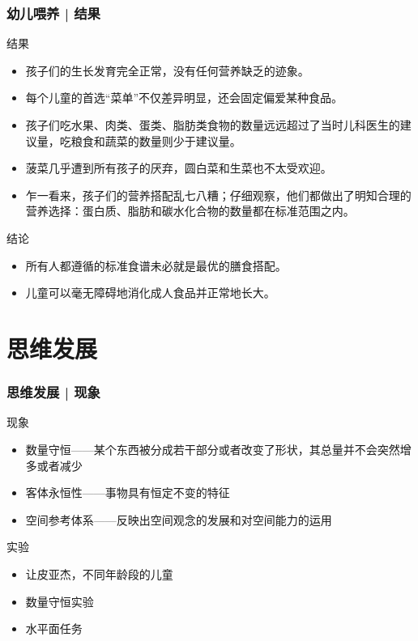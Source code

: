 \begin{frame}
  \frametitle{幼儿喂养 | 结果}
  \begin{block}{结果}
    \begin{itemize}
      \item 孩子们的生长发育完全正常，没有任何营养缺乏的迹象。
      \item 每个儿童的首选“菜单”不仅差异明显，还会固定偏爱某种食品。
      \item 孩子们吃水果、肉类、蛋类、脂肪类食物的数量远远超过了当时儿科医生的建议量，吃粮食和蔬菜的数量则少于建议量。
      \item 菠菜几乎遭到所有孩子的厌弃，圆白菜和生菜也不太受欢迎。
      \item 乍一看来，孩子们的营养搭配乱七八糟；仔细观察，他们都做出了明知合理的营养选择：蛋白质、脂肪和碳水化合物的数量都在标准范围之内。
    \end{itemize}
  \end{block}
  \pause
  \begin{block}{结论}
    \begin{itemize}
      \item 所有人都遵循的标准食谱未必就是最优的膳食搭配。
      \item 儿童可以毫无障碍地消化成人食品并正常地长大。
    \end{itemize}
  \end{block}
\end{frame}

\section{思维发展}
\begin{frame}
  \frametitle{思维发展 | 现象}
  \begin{block}{现象}
    \begin{itemize}
      \item 数量守恒——某个东西被分成若干部分或者改变了形状，其总量并不会突然增多或者减少
      \item 客体永恒性——事物具有恒定不变的特征
      \item 空间参考体系——反映出空间观念的发展和对空间能力的运用
    \end{itemize}
  \end{block}
  \pause
  \begin{block}{实验}
    \begin{itemize}
      \item 让\textbullet 皮亚杰，不同年龄段的儿童
      \item 数量守恒实验
      \item 水平面任务
    \end{itemize}
  \end{block}
\end{frame}

